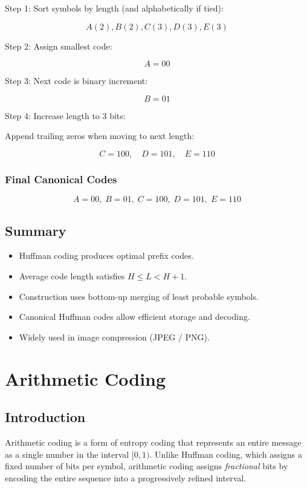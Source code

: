 \documentclass{AnantDocumentation}
\begin{document}
Step 1: Sort symbols by length (and alphabetically if tied):

\[
A(2), B(2), C(3), D(3), E(3)
\]

Step 2: Assign smallest code:

\[
A = 00
\]

Step 3: Next code is binary increment:

\[
B = 01
\]

Step 4: Increase length to 3 bits:

Append trailing zeros when moving to next length:

\[
C = 100,\quad D = 101,\quad E = 110
\]

\subsubsection*{Final Canonical Codes}

\[
\boxed{
A=00,\; B=01,\; C=100,\; D=101,\; E=110
}
\]

\subsection{Summary}

\begin{itemize}
\item Huffman coding produces optimal prefix codes.
\item Average code length satisfies \(H \le L < H+1\).
\item Construction uses bottom-up merging of least probable symbols.
\item Canonical Huffman codes allow efficient storage and decoding.
\item Widely used in image compression (JPEG / PNG).
\end{itemize}

\section{Arithmetic Coding}

\subsection{Introduction}

Arithmetic coding is a form of entropy coding that represents an entire message as a single number in the interval
\([0, 1)\).  
Unlike Huffman coding, which assigns a fixed number of bits per symbol, arithmetic coding assigns \emph{fractional} bits by encoding the entire sequence into a progressively refined interval.
\end{document}

